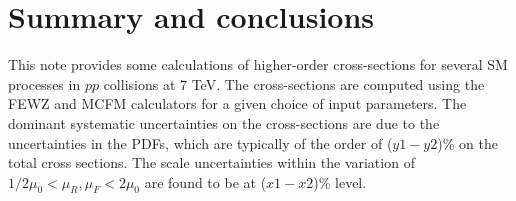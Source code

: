 \section{Summary and conclusions}
\label{sec:conclusion}
This note provides some calculations of higher-order cross-sections for 
several SM processes in $pp$ collisions at 7 TeV. The cross-sections are 
computed using the FEWZ and MCFM calculators for a given choice of input parameters. 
The dominant systematic uncertainties on the cross-sections are due to the 
uncertainties in the PDFs, which are typically of the order of ($y1-y2$)\% on 
the total cross sections. The scale uncertainties within the variation 
of $1/2 \mu_0 < \mu_R, \mu_F < 2\mu_0$ are found to be at ($x1-x2$)\% level. 

